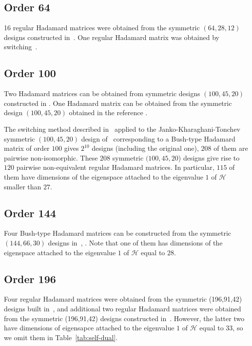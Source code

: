 \documentclass[12pt]{article}
\begin{document}
 \subsection{Order 64}
 16 regular Hadamard matrices were obtained from the symmetric $(64,28,12)$ designs constructed in~\cite{CrnPav:2001}. One regular Hadamard matrix was obtained by switching~\cite{CrnSv:Switching}.
\subsection{Order 100}
Two Hadamard matrices can be obtained from symmetric designs $(100,45,20)$ constructed in \cite{CES:2018}. One Hadamard matrix can be obtained
from the symmetric design $(100,45,20)$ obtained in the reference \cite{Pavcevic:96}.

The switching method described in~\cite{CrnSv:Switching} applied to the Janko-Kharaghani-Tonchev symmetric $(100,45,20)$ design of~\cite{JKT:2001} corresponding to a Bush-type Hadamard matrix of order $100$ gives
$2^{10}$ designs (including the original one), $208$ of them are pairwise non-isomorphic. These $208$ symmetric $(100,45,20$) designs give rise to $120$ pairwise non-equivalent regular Hadamard matrices. In particular, $115$ of them have dimensions of the eigenspace attached to the eigenvalue $1$ of $\mathcal{H}$ smaller than $27$.
\subsection{Order 144}
Four Bush-type Hadamard matrices can be constructed from the symmetric $(144,66,30)$ designs  in~\cite{Crn:2007:144-66-30}, \cite{Pavcevic:96}. Note that one of them has dimensions of the eigenspace attached to the eigenvalue $1$ of $\mathcal{H}$ equal to $28$.

\subsection{Order 196}
Four regular Hadamard matrices were obtained from the symmetric (196,91,42) designs built in~\cite{Crn:2007:196-91-42},
and additional two regular Hadamard matrices were obtained from the symmetric (196,91,42) designs constructed in~\cite{Crn:2005:Menon}. However, the latter two have dimensions of eigensapce attached to the eigenvalue $1$ of $\mathcal{H}$ equal to $33$, so we omit them in Table~\ref{tab:self-dual}.
\end{document}
